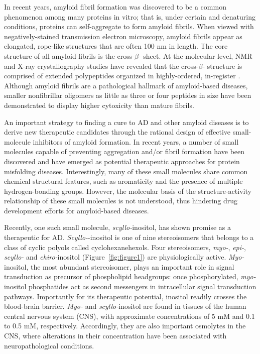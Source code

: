 In recent years, amyloid fibril formation was discovered to be a common phenomenon among many proteins in vitro; that is, under certain and denaturing conditions, proteins can self-aggregate to form amyloid fibrils.\cite{Chiti:2006p20} When viewed with negatively-stained transmission electron microscopy, amyloid fibrils appear as elongated, rope-like structures that are often 100 nm in length.\cite{Chiti:2006p20} The core structure of all amyloid fibrils is the cross-$\beta$- sheet.\cite{Chiti:2006p20,Serpell:2000p39} At the molecular level, NMR\cite{Balbach:2000p49,Petkova:2006p48} and X-ray crystallography\cite{Sawaya:2007p11} studies have revealed that the cross-$\beta$- structure is comprised of extended polypeptides organized in highly-ordered, in-register \bsheets. Although amyloid fibrils are a pathological hallmark of amyloid-based diseases, smaller nonfibrillar oligomers as little as three or four peptides in size have been demonstrated to display higher cytoxicity than mature fibrils.\cite{Gong:2003p22,Bitan:2003p10,Caughey:2009p5,Keshet:2010p61,Kitamura:2010p6,Lambert:1998p60,Selkoe:2008p16}

An important strategy to finding a cure to AD and other amyloid diseases is to derive new therapeutic candidates through the rational design of effective small-molecule inhibitors of amyloid formation. In recent years, a number of small molecules capable of preventing aggregation and/or fibril formation have been discovered and have emerged as potential therapeutic approaches for protein misfolding diseases.\cite{Frid:2007p65,Hawkes:2009p9,LeVine:2009p38,Necula:2007p42,ScherzerAttali:2010p63,Sood:2009p14} Interestingly, many of these small molecules share common chemical structural features, such as aromaticity and the presence of multiple hydrogen-bonding groups.\cite{Ehrnhoefer:2008p8,Liu:2009p18,Liu:2005p7,Porat:2006p33} However, the molecular basis of the structure-activity relationship of these small molecules is not understood, thus hindering drug development efforts for amyloid-based diseases.

Recently, one such small molecule, \textit{scyllo-}inositol, has shown promise as a therapeutic for AD.\cite{McLaurin:2006p29,McLaurin:2000p64} \textit{Scyllo-}-inositol is one of nine stereoisomers that belongs to a class of cyclic polyols called cyclohexanehexols. Four stereoisomers, \textit{myo-}, \textit{epi-}, \textit{scyllo-} and \textit{chiro-}inositol (Figure~\ref{fig:figure1}) are physiologically active.\cite{Fisher:2002p62} \textit{Myo-}inositol, the most abundant stereoisomer, plays an important role in signal transduction as precursor of phospholipid headgroups: once phosphorylated, \textit{myo-}inositol phosphatides act as second messengers in intracellular signal transduction pathways.\cite{Fisher:2002p62} Importantly for its therapeutic potential, inositol readily crosses the blood-brain barrier. \textit{Myo-} and \textit{scyllo-}inositol are found in tissues of the human central nervous system (CNS), with approximate concentrations of 5 mM and 0.1 to 0.5 mM, respectively.\cite{Michaelis:1993p89} Accordingly, they are also important osmolytes in the CNS, where alterations in their concentration have been associated with neuropathological conditions.\cite{Fisher:2002p62,Michell:2008p4}
 
